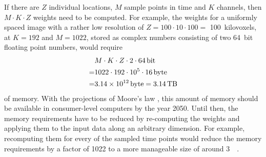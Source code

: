 If there are $Z$ individual locations, $M$ sample points in time and $K$ channels, then $M \cdot K \cdot Z$ weights need to be computed.
For example, the weights for a uniformly spaced image with a rather low resolution of  $Z = 100 \cdot 10 \cdot 100 =$ \SI{100}{kilovoxels},
at $K=192$ and $M=1022$, stored as complex numbers consisting of two \SI{64}{bit} floating point numbers, would require
\begin{align*}
      & M \cdot K \cdot Z \cdot 2 \cdot \SI{64}{\bit} \\
    = & 1022 \cdot 192 \cdot 10^5 \cdot \SI{16}{byte} \\
    = & \SI{3.14e12}{byte} = \SI{3.14}{\tera\byte}
\end{align*}
of memory.
With the projections of Moore's law \cite{mooreslaw},
this amount of memory should be available in consumer-level computers by the year 2050.
Until then, the memory requirements have to be reduced by re-computing the weights
and applying them to the input data along an arbitrary dimension.
For example, recomputing them for every of the sampled time points would reduce
the memory requirements by a factor of 1022 to a more manageable size of around \SI{3}{\giga\byte}.

